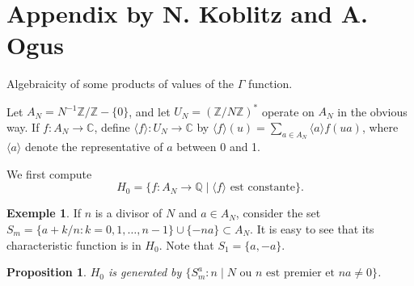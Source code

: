 \documentclass[12pt,a4paper]{article}
\theoremstyle{plain}
\newtheorem{proposition}[theorem]{Proposition}
\theoremstyle{definition}
\newtheorem{example}[definition]{Exemple}
\theoremstyle{remark}
\newcommand{\Q}{\mathbb{Q}}
\newcommand{\C}{\mathbb{C}}
\newcommand{\Z}{\mathbb{Z}}
\begin{document}
\section*{Appendix by N. Koblitz and A. Ogus}

Algebraicity of some products of values of the $\Gamma$ function.

Let $A_N = N^{-1}\Z/\Z - \{0\}$, and let $U_N = (\Z/N\Z)^*$ operate on $A_N$
in the obvious way. If $f: A_N \to \C$, define $\langle f \rangle: U_N \to \C$ by
$\langle f \rangle(u) = \sum_{a \in A_N} \langle a \rangle f(ua)$, where $\langle a \rangle$ denote the
representative of $a$ between 0 and 1.

We first compute
\[
H_0 = \{f: A_N \to \Q \mid \langle f \rangle \text{ est constante}\}.
\]

\begin{example}
If $n$ is a divisor of $N$ and $a \in A_N$, consider the set
$S_m = \{a + k/n: k = 0, 1, \ldots, n-1\} \cup \{-na\} \subset A_N$. It is easy to see
that its characteristic function is in $H_0$. Note that $S_1 = \{a, -a\}$.
\end{example}

\begin{proposition}
$H_0$ is generated by $\{S_m^a: n \mid N \text{ ou } n \text{ est premier et } na \neq 0\}$.
\end{proposition}
\end{document}
